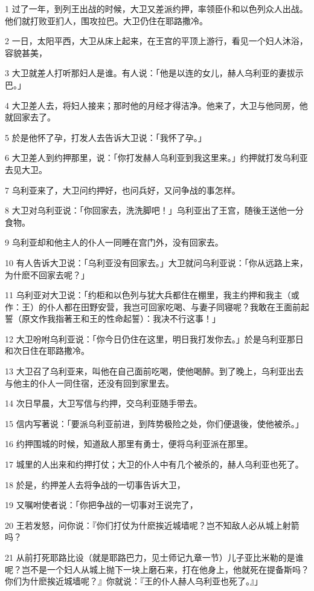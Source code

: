 \par 1 过了一年，到列王出战的时候，大卫又差派约押，率领臣仆和以色列众人出战。他们就打败亚扪人，围攻拉巴。大卫仍住在耶路撒冷。
\par 2 一日，太阳平西，大卫从床上起来，在王宫的平顶上游行，看见一个妇人沐浴，容貌甚美，
\par 3 大卫就差人打听那妇人是谁。有人说：「他是以连的女儿，赫人乌利亚的妻拔示巴。」
\par 4 大卫差人去，将妇人接来；那时他的月经才得洁净。他来了，大卫与他同房，他就回家去了。
\par 5 於是他怀了孕，打发人去告诉大卫说：「我怀了孕。」
\par 6 大卫差人到约押那里，说：「你打发赫人乌利亚到我这里来。」约押就打发乌利亚去见大卫。
\par 7 乌利亚来了，大卫问约押好，也问兵好，又问争战的事怎样。
\par 8 大卫对乌利亚说：「你回家去，洗洗脚吧！」乌利亚出了王宫，随後王送他一分食物。
\par 9 乌利亚却和他主人的仆人一同睡在宫门外，没有回家去。
\par 10 有人告诉大卫说：「乌利亚没有回家去。」大卫就问乌利亚说：「你从远路上来，为什麽不回家去呢？」
\par 11 乌利亚对大卫说：「约柜和以色列与犹大兵都住在棚里，我主约押和我主（或作：王）的仆人都在田野安营，我岂可回家吃喝、与妻子同寝呢？我敢在王面前起誓（原文作我指著王和王的性命起誓）：我决不行这事！」
\par 12 大卫吩咐乌利亚说：「你今日仍住在这里，明日我打发你去。」於是乌利亚那日和次日住在耶路撒冷。
\par 13 大卫召了乌利亚来，叫他在自己面前吃喝，使他喝醉。到了晚上，乌利亚出去与他主的仆人一同住宿，还没有回到家里去。
\par 14 次日早晨，大卫写信与约押，交乌利亚随手带去。
\par 15 信内写著说：「要派乌利亚前进，到阵势极险之处，你们便退後，使他被杀。」
\par 16 约押围城的时候，知道敌人那里有勇士，便将乌利亚派在那里。
\par 17 城里的人出来和约押打仗；大卫的仆人中有几个被杀的，赫人乌利亚也死了。
\par 18 於是，约押差人去将争战的一切事告诉大卫，
\par 19 又嘱咐使者说：「你把争战的一切事对王说完了，
\par 20 王若发怒，问你说：『你们打仗为什麽挨近城墙呢？岂不知敌人必从城上射箭吗？
\par 21 从前打死耶路比设（就是耶路巴力，见士师记九章一节）儿子亚比米勒的是谁呢？岂不是一个妇人从城上抛下一块上磨石来，打在他身上，他就死在提备斯吗？你们为什麽挨近城墙呢？』你就说：『王的仆人赫人乌利亚也死了。』」
